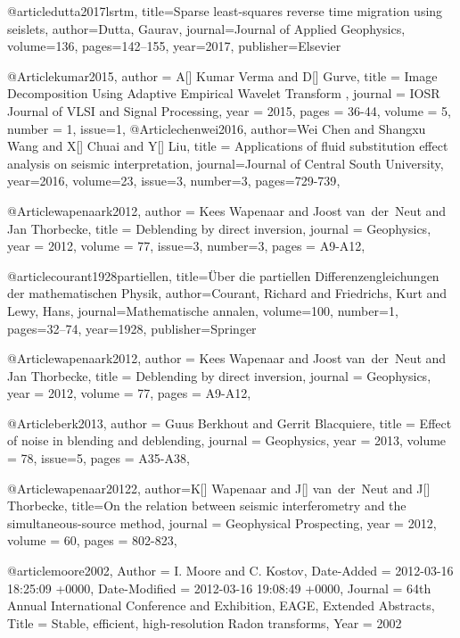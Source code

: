 @article{dutta2017lsrtm,
  title={Sparse least-squares reverse time migration using seislets},
  author={Dutta, Gaurav},
  journal={Journal of Applied Geophysics},
  volume={136},
  pages={142--155},
  year={2017},
  publisher={Elsevier}
}


@Article{kumar2015,
  author = 	 {A[] Kumar Verma and D[] Gurve},
  title = 	 {Image Decomposition Using Adaptive Empirical Wavelet Transform  
},
  journal = 	 {IOSR Journal of VLSI and Signal Processing},
  year = 	 2015,
  pages =	 {36-44},
  volume =    {5},
  number =    {1},
  issue=1,
}
@Article{chenwei2016,
  author={Wei Chen and Shangxu Wang and X[] Chuai and Y[] Liu},
  title = {Applications of fluid substitution effect analysis on seismic interpretation},
  journal={Journal of Central South University},
  year=2016,
  volume=23,
  issue=3,
  number=3,
  pages={729-739},
}

@Article{wapenaark2012,
  author = 	 {Kees Wapenaar and Joost van~der~Neut and Jan Thorbecke},
  title = 	 {Deblending by direct inversion},
  journal = 	 {Geophysics},
  year = 	 2012,
  volume =	 77,
  issue=3,
  number=3,
  pages =	 {A9-A12},
}

@article{courant1928partiellen,
  title={{\"U}ber die partiellen Differenzengleichungen der mathematischen Physik},
  author={Courant, Richard and Friedrichs, Kurt and Lewy, Hans},
  journal={Mathematische annalen},
  volume={100},
  number={1},
  pages={32--74},
  year={1928},
  publisher={Springer}
}

@Article{wapenaark2012,
  author = 	 {Kees Wapenaar and Joost van~der~Neut and Jan Thorbecke},
  title = 	 {Deblending by direct inversion},
  journal = 	 {Geophysics},
  year = 	 2012,
  volume =	 77,
  pages =	 {A9-A12},
}

@Article{berk2013,
  author = 	 {Guus Berkhout and Gerrit Blacquiere},
  title = 	 {Effect of noise in blending and deblending},
  journal = 	 {Geophysics},
  year = 	 2013,
  volume =	 78,
  issue=5,
  pages =	 {A35-A38},
}


@Article{wapenaar20122,
  author={K[] Wapenaar and J[] van~der~Neut and J[] Thorbecke},
  title={On the relation between seismic interferometry and the simultaneous-source method},
  journal = 	 {Geophysical Prospecting},
  year = 	 2012,
  volume =	 60,
  pages =	 {802-823},
}

@article{moore2002,
	Author = {I. Moore and C. Kostov},
	Date-Added = {2012-03-16 18:25:09 +0000},
	Date-Modified = {2012-03-16 19:08:49 +0000},
	Journal = {64th Annual International Conference and Exhibition, EAGE, Extended Abstracts},
	Title = {Stable, efficient, high-resolution {R}adon transforms},
	Year = {2002}}

